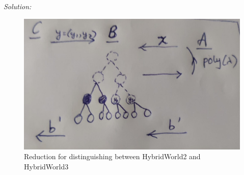 \documentclass[a4paper, 11pt]{article}
\newenvironment{solution}
    {\textit{Solution:}}
    {\clearpage}
\begin{document}
\begin{solution}
\begin{enumerate}[(a)]
\begin{figure}[!ht]
                \includegraphics[scale=0.25]{images/Tree Red.png.jpg}
                \caption{Reduction for distinguishing between HybridWorld2 and HybridWorld3}
                \label{fig:p4a2}
              \end{figure}



\end{enumerate}
\end{solution}
\end{document}
